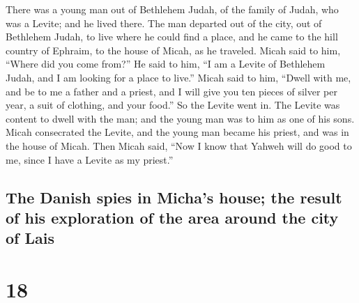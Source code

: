  There was a young man out of Bethlehem Judah, of the
family of Judah, who was a Levite; and he lived there. 
The man departed out of the city, out of Bethlehem Judah, to live where
he could find a place, and he came to the hill country of Ephraim, to
the house of Micah, as he traveled.  Micah said to him,
``Where did you come from?'' He said to him, ``I am a Levite of
Bethlehem Judah, and I am looking for a place to live.'' 
Micah said to him, ``Dwell with me, and be to me a father and a priest,
and I will give you ten pieces of silver per year, a suit of clothing,
and your food.'' So the Levite went in.  The Levite was
content to dwell with the man; and the young man was to him as one of
his sons.  Micah consecrated the Levite, and the young
man became his priest, and was in the house of Micah. 
Then Micah said, ``Now I know that Yahweh will do good to me, since I
have a Levite as my priest.''

\hypertarget{the-danish-spies-in-michas-house-the-result-of-his-exploration-of-the-area-around-the-city-of-lais}{%
\subsection{The Danish spies in Micha's house; the result of his
exploration of the area around the city of
Lais}\label{the-danish-spies-in-michas-house-the-result-of-his-exploration-of-the-area-around-the-city-of-lais}}

\hypertarget{section-17}{%
\section{18}\label{section-17}}


